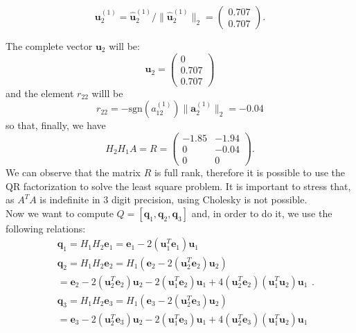 \documentclass[a4paper,11pt]{article}
\begin{document}
\begin{equation}\label{key}
	\textbf{u}_2^{(1)} = \hat{\textbf{u}}_2^{(1)}/ \lVert \hat{\textbf{u}}_2 ^{(1)}\rVert_2 = \begin{pmatrix}
		0.707\\
		0.707
	\end{pmatrix}.
\end{equation}

\noindent The complete vector $\textbf{u}_2$ will be:
\begin{equation}\label{key}
	\textbf{u}_2 = \begin{pmatrix}
		0\\
		0.707\\
		0.707
	\end{pmatrix}
\end{equation}
and the element $r_{22}$ willl be
\begin{equation}\label{key}
	r_{22} = - \text{sgn}(a_{12}^{(1)}) \lVert \textbf{a}_2^{(1)} \rVert_2 = -0.04
\end{equation}
so that, finally, we have
\begin{equation}\label{key}
	H_2 H_1 A = R = \begin{pmatrix}
		-1.85& -1.94 \\
		0& -0.04  \\
		0& 0
	\end{pmatrix}.
\end{equation}
We can observe that the matrix $R$ is full rank, therefore it is possible to use the QR factorization to solve the least square problem. It is important to stress that, as $A^T A$ is indefinite in $3$ digit precision, using Cholesky is not possible.\\
Now we want to compute $Q=[\textbf{q}_1,\textbf{q}_2,\textbf{q}_3]$ and, in order to do it, we use the following relations:
\begin{equation}\label{key}
	\begin{split}
		&\textbf{q}_1 = H_1 H_2 \textbf{e}_1 = \textbf{e}_1 - 2 (\textbf{u}_1^T \textbf{e}_1) \textbf{u}_1\\
		&  \textbf{q}_2 = H_1 H_2 \textbf{e}_2 = H_1 (\textbf{e}_2 - 2 (\textbf{u}_2^T \textbf{e}_2) \textbf{u}_2)  \\
		&=  \textbf{e}_2 - 2 (\textbf{u}_2^T \textbf{e}_2) \textbf{u}_2 -  2 (\textbf{u}_1^T \textbf{e}_2) \textbf{u}_1  + 4 (\textbf{u}_2^T \textbf{e}_2)(\textbf{u}_1^T \textbf{u}_2)\textbf{u}_1\\
		&  \textbf{q}_3 = H_1 H_2 \textbf{e}_3 = H_1 (\textbf{e}_3 - 2 (\textbf{u}_2^T \textbf{e}_3) \textbf{u}_2)  \\
		&=  \textbf{e}_3 - 2 (\textbf{u}_2^T \textbf{e}_3) \textbf{u}_2 -  2 (\textbf{u}_1^T \textbf{e}_3) \textbf{u}_1  + 4 (\textbf{u}_2^T \textbf{e}_3)(\textbf{u}_1^T \textbf{u}_2)\textbf{u}_1
	\end{split}.
\end{equation}
\end{document}
